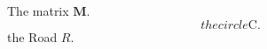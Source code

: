 \documentclass{article}
\begin{document}
The matrix $\mathbf{M}$.
\[
the circle \mathrm{C}.
\]
the Road $\mathit{R}$.
\end{document}
